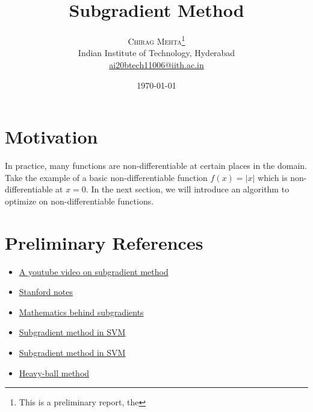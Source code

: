 \documentclass[twoside,twocolumn]{article}
\title{Subgradient Method} %
\author{%
\textsc{Chirag Mehta}\thanks{This is a preliminary report, the } \\[1ex] %
\normalsize Indian Institute of Technology, Hyderabad \\ %
\normalsize \href{mailto:ai20btech11006@iith.ac.in}{ai20btech11006@iith.ac.in} %
}
\date{\today} %
\begin{document}
\maketitle

\section{Motivation}
In practice, many functions are non-differentiable at certain places in the domain. Take the example of a basic non-differentiable function $f(x) = \left| x \right|$ which is non-differentiable at $x=0$. In the next section, we will introduce an algorithm to optimize on non-differentiable functions.












% 
% 

\section{Preliminary References}
\begin{itemize}
    \item \href{https://www.youtube.com/watch?v=jYtCiV1aP44}{A youtube video on subgradient method}
    \item \href{https://web.stanford.edu/class/ee392o/subgrad_method.pdf}{Stanford notes}
    \item \href{https://www.stat.cmu.edu/~ryantibs/convexopt-S15/scribes/06-subgradients-scribed.pdf}{Mathematics behind subgradients}
    \item \href{https://mcneela.github.io/machine_learning/2020/04/24/Subgradient-Descent.html}{Subgradient method in SVM}
    \item \href{https://davidrosenberg.github.io/mlcourse/Archive/2018/Lectures/03c.subgradient-descent.pdf}{Subgradient method in SVM}
    \item \href{https://web.stanford.edu/class/ee364b/lectures/subgrad_method_notes.pdf}{Heavy-ball method}
\end{itemize}
\end{document}
